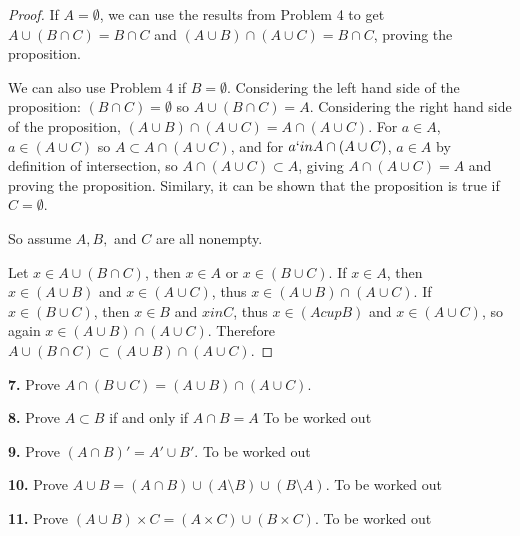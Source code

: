 \documentclass[12pt]{amsart}
\newenvironment{statement}[1]{\smallskip\noindent\color[rgb]{1.00,0.00,0.50} {\bf #1.}}{}
\theoremstyle{definition}
\theoremstyle{remark}
\begin{document}
\begin{proof}
  If $A = \emptyset$, we can use the results from Problem 4 to get $A
  \cup (B \cap C) = B \cap C$ and $(A \cup B) \cap (A \cup C) = B \cap
  C$, proving the proposition.

  We can also use Problem 4 if $B = \emptyset$. Considering the left
  hand side of the proposition: $(B \cap C) = \emptyset$ so $A \cup (B
  \cap C) = A$. Considering the right hand side of the proposition,
  $(A \cup B) \cap (A \cup C) = A \cap (A \cup C)$. For $a \in A$, $a
  \in (A \cup C)$ so $A \subset A \cap (A \cup C)$, and for $a` in A
  \cap (A \cup C)$, $a \in A$ by definition of intersection, so $A
  \cap (A \cup C) \subset A$, giving $A \cap (A \cup C) = A$ and
  proving the proposition. Similary, it can be shown that the
  proposition is true if $C = \emptyset$.

  So assume $A, B,$ and $C$ are all nonempty.
  
  Let $x \in A \cup (B \cap C)$, then $x \in A$ or $x \in (B \cup
  C)$. If $x \in A$, then $x \in (A \cup B)$ and $x \in (A \cup C)$,
  thus $x \in (A \cup B) \cap (A \cup C)$. If $x \in (B \cup C)$, then
  $x \in B$ and $x in C$, thus $x \in (A cup B)$ and $x \in (A \cup
  C)$, so again $x \in (A \cup B) \cap (A \cup C)$. Therefore $A \cup
  (B \cap C) \subset (A \cup B) \cap (A \cup C)$.
\end{proof}


\begin{statement}{7}
Prove $A \cap (B \cup C) = (A \cup B) \cap (A \cup C)$.
\end{statement}




\begin{statement}{8}
Prove $A \subset B$ if and only if $A \cap B = A$
\end{statement}
To be worked out


\begin{statement}{9}
Prove $(A \cap B)' = A' \cup B'$.
\end{statement}
To be worked out


\begin{statement}{10}
Prove $A \cup B = (A \cap B) \cup (A \setminus B) \cup (B \setminus A)$.
\end{statement}
To be worked out


\begin{statement}{11}
Prove $(A \cup B) \times C = (A \times C) \cup (B \times C)$.
\end{statement}
To be worked out
\end{document}

